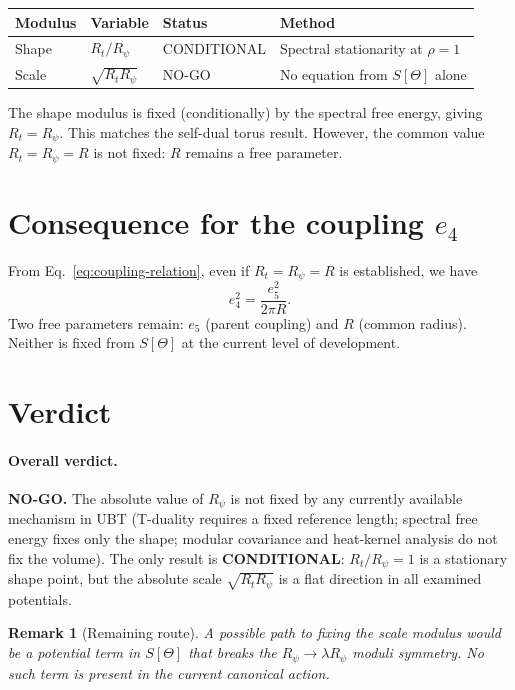 \documentclass[11pt,a4paper]{article}
\newtheorem{remark}[proposition]{Remark}
\begin{document}
\begin{center}
\begin{tabular}{@{}llll@{}}
\toprule
Modulus & Variable & Status & Method \\
\midrule
Shape & $R_t/R_\psi$ & CONDITIONAL & Spectral stationarity at $\rho=1$ \\
Scale & $\sqrt{R_t R_\psi}$ & NO-GO & No equation from $S[\Theta]$ alone \\
\bottomrule
\end{tabular}
\end{center}

The shape modulus is fixed (conditionally) by the spectral free energy, giving
$R_t=R_\psi$.  This matches the self-dual torus result.  However, the common
value $R_t=R_\psi=R$ is not fixed: $R$ remains a free parameter.

\section{Consequence for the coupling $e_4$}

From Eq.~\eqref{eq:coupling-relation}, even if $R_t=R_\psi=R$ is established,
we have
\begin{equation}
  e_4^2 = \frac{e_5^2}{2\pi R}.
\end{equation}
Two free parameters remain: $e_5$ (parent coupling) and $R$ (common radius).
Neither is fixed from $S[\Theta]$ at the current level of development.

\section{Verdict}

\paragraph{Overall verdict.}
\textbf{NO-GO.}
The absolute value of $R_\psi$ is not fixed by any currently available mechanism
in UBT (T-duality requires a fixed reference length; spectral free energy fixes
only the shape; modular covariance and heat-kernel analysis do not fix the
volume).  The only result is \textbf{CONDITIONAL}: $R_t/R_\psi=1$ is a
stationary shape point, but the absolute scale $\sqrt{R_t R_\psi}$ is a flat
direction in all examined potentials.

\begin{remark}[Remaining route]
A possible path to fixing the scale modulus would be a potential term in
$S[\Theta]$ that breaks the $R_\psi\to\lambda R_\psi$ moduli symmetry.
No such term is present in the current canonical action.
\end{remark}
\end{document}
